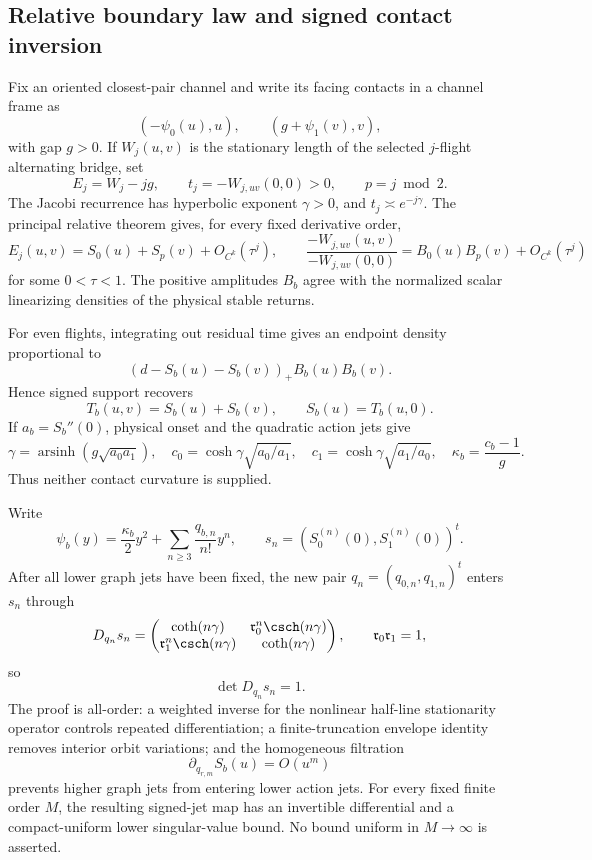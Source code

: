 \subsection{Relative boundary law and signed contact inversion}

Fix an oriented closest-pair channel and write its facing contacts in a
channel frame as
\[
 (-\psi_0(u),u),\qquad (g+\psi_1(v),v),
\]
with gap \(g>0\).  If \(W_j(u,v)\) is the stationary length of the selected
\(j\)-flight alternating bridge, set
\[
 E_j=W_j-jg,
 \qquad t_j=-W_{j,uv}(0,0)>0,
 \qquad p=j\bmod2.
\]
The Jacobi recurrence has hyperbolic exponent \(\gamma>0\), and
\(t_j\asymp e^{-j\gamma}\).  The principal relative theorem gives, for every
fixed derivative order,
\begin{equation}\label{eq:intro-v23-relative}
 E_j(u,v)=S_0(u)+S_p(v)+O_{C^k}(\tau^j),
 \qquad
 \frac{-W_{j,uv}(u,v)}{-W_{j,uv}(0,0)}
 =B_0(u)B_p(v)+O_{C^k}(\tau^j)
\end{equation}
for some \(0<\tau<1\).  The positive amplitudes \(B_b\) agree with the
normalized scalar linearizing densities of the physical stable returns.

For even flights, integrating out residual time gives an endpoint density
proportional to
\[
                    (d-S_b(u)-S_b(v))_+B_b(u)B_b(v).
\]
Hence signed support recovers
\[
 T_b(u,v)=S_b(u)+S_b(v),\qquad S_b(u)=T_b(u,0).
\]
If \(a_b=S_b''(0)\), physical onset and the quadratic action jets give
\begin{equation}\label{eq:intro-v23-leading}
 \gamma=\operatorname{arsinh}(g\sqrt{a_0a_1}),
 \quad
 c_0=\cosh\gamma\sqrt{a_0/a_1},
 \quad
 c_1=\cosh\gamma\sqrt{a_1/a_0},
 \quad
 \kappa_b=\frac{c_b-1}{g}.
\end{equation}
Thus neither contact curvature is supplied.

Write
\[
 \psi_b(y)=\frac{\kappa_b}{2}y^2+
 \sum_{n\ge3}\frac{q_{b,n}}{n!}y^n,
 \qquad
 s_n=(S_0^{(n)}(0),S_1^{(n)}(0))^t.
\]
After all lower graph jets have been fixed, the new pair
\(q_n=(q_{0,n},q_{1,n})^t\) enters \(s_n\) through
\begin{equation}\label{eq:intro-v23-jet-block}
 D_{q_n}s_n=
 \begin{pmatrix}
 \coth(n\gamma)&\mathfrak r_0^n\csch(n\gamma)\\
 \mathfrak r_1^n\csch(n\gamma)&\coth(n\gamma)
 \end{pmatrix},
 \qquad \mathfrak r_0\mathfrak r_1=1,
\end{equation}
so
\[
                         \det D_{q_n}s_n=1.
\]
The proof is all-order: a weighted inverse for the nonlinear half-line
stationarity operator controls repeated differentiation; a finite-truncation
envelope identity removes interior orbit variations; and the homogeneous
filtration
\[
                     \partial_{q_{r,m}}S_b(u)=O(u^m)
\]
prevents higher graph jets from entering lower action jets.  For every fixed
finite order \(M\), the resulting signed-jet map has an invertible differential
and a compact-uniform lower singular-value bound.  No bound uniform in
\(M\to\infty\) is asserted.

